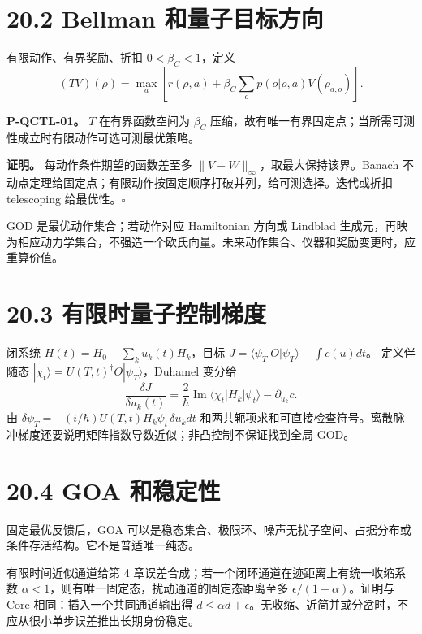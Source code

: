 \documentclass[
  11pt,
  oneside]{book}
\begin{document}
\hypertarget{bellman-ux548cux91cfux5b50ux76eeux6807ux65b9ux5411}{%
\section{20.2 Bellman
和量子目标方向}\label{bellman-ux548cux91cfux5b50ux76eeux6807ux65b9ux5411}}

有限动作、有界奖励、折扣 \(0<\beta_C<1\)，定义 \[
(TV)(\rho)=\max_a\left[r(\rho,a)+
\beta_C\sum_op(o|\rho,a)V(\rho_{a,o})\right].
\]

\protect\hypertarget{p-qctl-01}{}{}

\textbf{P-QCTL-01。} \(T\) 在有界函数空间为 \(\beta_C\)
压缩，故有唯一有界固定点；当所需可测性成立时有限动作可选可测最优策略。

\textbf{证明。} 每动作条件期望的函数差至多
\(\|V-W\|_\infty\)，取最大保持该界。Banach
不动点定理给固定点；有限动作按固定顺序打破并列，给可测选择。迭代或折扣
telescoping 给最优性。\(\square\)

GOD 是最优动作集合；若动作对应 Hamiltonian 方向或 Lindblad
生成元，再映为相应动力学集合，不强造一个欧氏向量。未来动作集合、仪器和奖励变更时，应重算价值。

\hypertarget{ux6709ux9650ux65f6ux91cfux5b50ux63a7ux5236ux68afux5ea6}{%
\section{20.3
有限时量子控制梯度}\label{ux6709ux9650ux65f6ux91cfux5b50ux63a7ux5236ux68afux5ea6}}

闭系统 \(H(t)=H_0+\sum_k u_k(t)H_k\)，目标
\(J=\langle\psi_T|O|\psi_T\rangle-\int c(u)dt\)。 定义伴随态
\(|\chi_t\rangle=U(T,t)^\dagger O|\psi_T\rangle\)，Duhamel 变分给 \[
\frac{\delta J}{\delta u_k(t)}
=\frac2\hbar\operatorname{Im}\langle\chi_t|H_k|\psi_t\rangle
-\partial_{u_k}c.
\] 由 \(\delta\psi_T=-(i/\hbar)U(T,t)H_k\psi_t\,\delta u_kdt\)
和两共轭项求和可直接检查符号。离散脉冲梯度还要说明矩阵指数导数近似；非凸控制不保证找到全局
GOD。

\hypertarget{goa-ux548cux7a33ux5b9aux6027}{%
\section{20.4 GOA 和稳定性}\label{goa-ux548cux7a33ux5b9aux6027}}

固定最优反馈后，GOA
可以是稳态集合、极限环、噪声无扰子空间、占据分布或条件存活结构。它不是普适唯一纯态。

有限时间近似通道给第 4
章误差合成；若一个闭环通道在迹距离上有统一收缩系数
\(\alpha<1\)，则有唯一固定态，扰动通道的固定态距离至多
\(\epsilon/(1-\alpha)\)。证明与 Core 相同：插入一个共同通道输出得
\(d\le\alpha d+\epsilon\)。无收缩、近简并或分岔时，不应从很小单步误差推出长期身份稳定。
\end{document}
